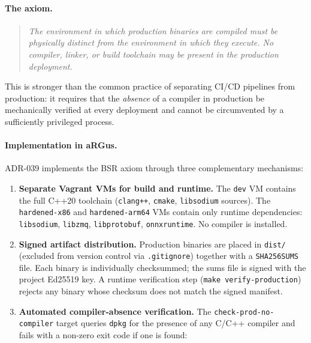 \documentclass[11pt,a4paper]{article}
\begin{document}
    \paragraph{The axiom.}
    \begin{quote}
        \emph{The environment in which production binaries are compiled must be
        physically distinct from the environment in which they execute. No compiler,
            linker, or build toolchain may be present in the production deployment.}
    \end{quote}

    This is stronger than the common practice of separating CI/CD pipelines from
    production: it requires that the \emph{absence} of a compiler in production be
    mechanically verified at every deployment and cannot be circumvented by a
    sufficiently privileged process.

    \paragraph{Implementation in aRGus.}
    ADR-039 implements the BSR axiom through three complementary mechanisms:

    \begin{enumerate}
        \item \textbf{Separate Vagrant VMs for build and runtime.}
        The \texttt{dev} VM contains the full C++20 toolchain
        (\texttt{clang++}, \texttt{cmake}, \texttt{libsodium} sources).
        The \texttt{hardened-x86} and \texttt{hardened-arm64} VMs contain
        only runtime dependencies: \texttt{libsodium}, \texttt{libzmq},
        \texttt{libprotobuf}, \texttt{onnxruntime}. No compiler is installed.

        \item \textbf{Signed artifact distribution.}
        Production binaries are placed in \texttt{dist/} (excluded from
        version control via \texttt{.gitignore}) together with a
        \texttt{SHA256SUMS} file. Each binary is individually checksummed;
        the sums file is signed with the project Ed25519 key.
        A runtime verification step (\texttt{make verify-production}) rejects
        any binary whose checksum does not match the signed manifest.

        \item \textbf{Automated compiler-absence verification.}
        The \texttt{check-prod-no-compiler} target queries \texttt{dpkg}
        for the presence of any C/C++ compiler and fails with a non-zero
        exit code if one is found:
    \end{enumerate}
\end{document}
